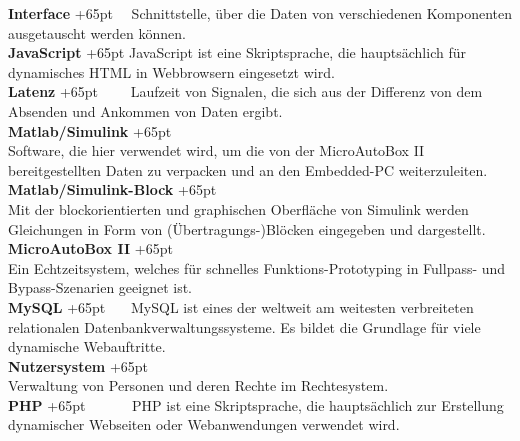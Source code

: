 \documentclass[fontsize = 12pt, paper = a4]{scrreprt}
\begin{document}
\textbf{Interface}
\hangindent+65pt 
\ \ Schnittstelle, über die Daten von verschiedenen Komponenten ausgetauscht werden können.\\

\textbf{JavaScript}
\hangindent+65pt 
JavaScript ist eine Skriptsprache, die hauptsächlich für dynamisches HTML in Webbrowsern eingesetzt wird. \\

\textbf{Latenz}
\hangindent+65pt 
\ \ \ \ Laufzeit von Signalen, die sich aus der Differenz von dem Absenden und Ankommen von Daten ergibt.\\

\textbf{Matlab/Simulink}
\hangindent+65pt  \\
Software, die hier verwendet wird, um die von der MicroAutoBox II bereitgestellten Daten zu verpacken und an den Embedded-PC weiterzuleiten.\\

\textbf{Matlab/Simulink-Block}
\hangindent+65pt  \\
Mit der blockorientierten und graphischen Oberfläche von Simulink werden Gleichungen in Form von (Übertragungs-)Blöcken eingegeben und dargestellt.\\

\textbf{MicroAutoBox II}
\hangindent+65pt  \\
Ein Echtzeitsystem, welches für schnelles Funktions-Prototyping in Fullpass- und Bypass-Szenarien geeignet ist.\\


\textbf{MySQL}
\hangindent+65pt  
\ \ \  MySQL ist eines der weltweit am weitesten verbreiteten relationalen Datenbankverwaltungssysteme. Es bildet die Grundlage für viele dynamische Webauftritte.\\

\textbf{Nutzersystem}
\hangindent+65pt  \\
Verwaltung von Personen und deren Rechte im Rechtesystem.\\



\textbf{PHP}
\hangindent+65pt 
\ \ \ \ \ \ PHP ist eine Skriptsprache, die hauptsächlich zur Erstellung dynamischer Webseiten oder Webanwendungen verwendet wird.\\
\end{document}
